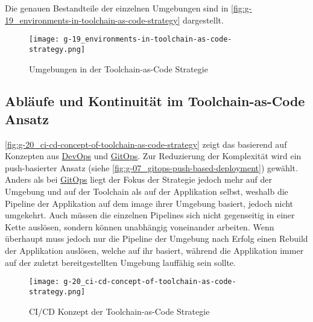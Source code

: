Die genauen Bestandteile der einzelnen Umgebungen sind in \autoref{fig:g-19_environments-in-toolchain-as-code-strategy} dargestellt.

\begin{figure}[htp]
    \centering
    \texttt{[image: g-19\_environments-in-toolchain-as-code-strategy.png]}
    \caption{Umgebungen in der Toolchain-as-Code Strategie}
    \label{fig:g-19_environments-in-toolchain-as-code-strategy}
\end{figure}

\subsection{Abläufe und Kontinuität im Toolchain-as-Code Ansatz}
\label{subsec:05-02-03_workflows-and-continuity-in-the-toolchain-as-code-approach}

\autoref{fig:g-20_ci-cd-concept-of-toolchain-as-code-strategy} zeigt das  basierend auf Konzepten aus \hyperref[sec:03-01_introduction-to-devops]{DevOps} und \hyperref[sec:03-03_gitops-as-further-evolution]{GitOps}. Zur Reduzierung der Komplexität wird ein push-basierter Ansatz (siehe \autoref{fig:g-07_gitops-push-based-deployment}) gewählt. Anders als bei \hyperref[sec:03-03_gitops-as-further-evolution]{GitOps} liegt der Fokus der  Strategie jedoch mehr auf der Umgebung und auf der Toolchain als auf der Applikation selbst, weshalb die Pipeline der Applikation auf dem \Gls{image} ihrer Umgebung basiert, jedoch nicht umgekehrt. Auch müssen die einzelnen Pipelines sich nicht gegenseitig in einer Kette auslösen, sondern können unabhängig voneinander arbeiten. Wenn überhaupt muss jedoch nur die Pipeline der Umgebung nach Erfolg einen Rebuild der Applikation auslösen, welche auf ihr basiert, während die Applikation immer auf der zuletzt bereitgestellten Umgebung lauffähig sein sollte.

\begin{figure}[h]
    \centering
    \texttt{[image: g-20\_ci-cd-concept-of-toolchain-as-code-strategy.png]}
    \caption{CI/CD Konzept der Toolchain-as-Code Strategie}
    \label{fig:g-20_ci-cd-concept-of-toolchain-as-code-strategy}
\end{figure}

